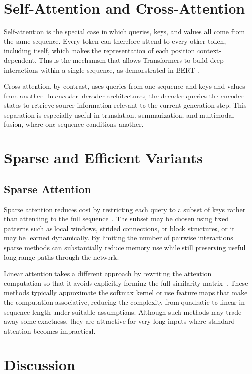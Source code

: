 \documentclass[a4paper,11pt]{article}
\begin{document}
\section{Self-Attention and Cross-Attention}\label{sec:selfcross}

Self-attention is the special case in which queries, keys, and values all come from the same sequence. Every token can therefore attend to every other token, including itself, which makes the representation of each position context-dependent. This is the mechanism that allows Transformers to build deep interactions within a single sequence, as demonstrated in BERT~\cite{devlin2019bert}.

Cross-attention, by contrast, uses queries from one sequence and keys and values from another. In encoder--decoder architectures, the decoder queries the encoder states to retrieve source information relevant to the current generation step. This separation is especially useful in translation, summarization, and multimodal fusion, where one sequence conditions another.
\section{Sparse and Efficient Variants}\label{sec:sparse}
\subsection{Sparse Attention}

Sparse attention reduces cost by restricting each query to a subset of keys rather than attending to the full sequence~\cite{beltagy2020longformer}. The subset may be chosen using fixed patterns such as local windows, strided connections, or block structures, or it may be learned dynamically. By limiting the number of pairwise interactions, sparse methods can substantially reduce memory use while still preserving useful long-range paths through the network.

Linear attention takes a different approach by rewriting the attention computation so that it avoids explicitly forming the full similarity matrix~\cite{choromanski2021rethinking,wang2020linformer}. These methods typically approximate the softmax kernel or use feature maps that make the computation associative, reducing the complexity from quadratic to linear in sequence length under suitable assumptions. Although such methods may trade away some exactness, they are attractive for very long inputs where standard attention becomes impractical.
\section{Discussion}
\end{document}
